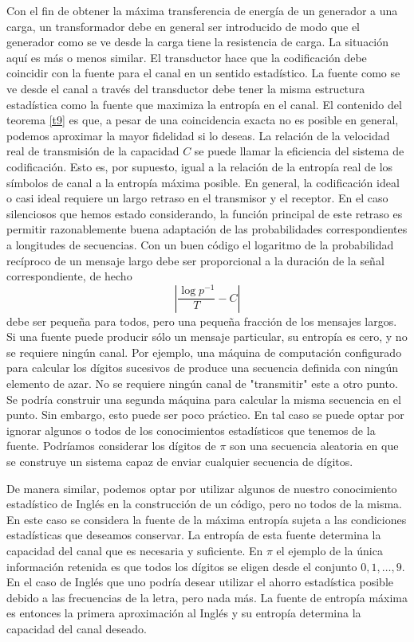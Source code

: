 Con el fin de obtener la m\'axima transferencia de energ\'ia de un
generador a una carga, un transformador debe en general ser
introducido de modo que el generador como se ve desde la carga tiene
la resistencia de carga. La situaci\'on aqu\'i es m\'as o menos
similar. El transductor hace que la codificaci\'on debe coincidir con
la fuente para el canal en un sentido estad\'istico. La fuente como se
ve desde el canal a trav\'es del transductor debe tener la misma
estructura estad\'istica como la fuente que maximiza la entrop\'ia en
el canal. El contenido del teorema \ref{t9} es que, a pesar de una
coincidencia exacta no es posible en general, podemos aproximar la
mayor fidelidad si lo deseas. La relaci\'on de la velocidad real de
transmisi\'on de la capacidad $C$ se puede llamar la eficiencia del
sistema de codificaci\'on. Esto es, por supuesto, igual a la
relaci\'on de la entrop\'ia real de los s\'imbolos de canal a la
entrop\'ia m\'axima posible. En general, la codificaci\'on ideal o
casi ideal requiere un largo retraso en el transmisor y el receptor.
En el caso silenciosos que hemos estado considerando, la funci\'on
principal de este retraso es permitir razonablemente buena
adaptaci\'on de las probabilidades correspondientes a longitudes de
secuencias. Con un buen c\'odigo el logaritmo de la probabilidad
rec\'iproco de un mensaje largo debe ser proporcional a la duraci\'on
de la se\~{n}al correspondiente, de hecho
\begin{equation}
\left |\frac{\log p^{-1}}{T} - C \right |
\end{equation}
debe ser peque\~{n}a para todos, pero una peque\~{n}a fracci\'on de
los mensajes largos. Si una fuente puede producir s\'olo un mensaje
particular, su entrop\'ia es cero, y no se requiere ning\'un canal.
Por ejemplo, una m\'aquina de computaci\'on configurado para calcular
los d\'igitos sucesivos de produce una secuencia definida con ning\'un
elemento de azar. No se requiere ning\'un canal de "transmitir" este a
otro punto. Se podr\'ia construir una segunda m\'aquina para calcular
la misma secuencia en el punto. Sin embargo, esto puede ser poco
pr\'actico. En tal caso se puede optar por ignorar algunos o todos de
los conocimientos estad\'isticos que tenemos de la fuente. Podr\'iamos
considerar los d\'igitos de $\pi$ son una secuencia aleatoria en que
se construye un sistema capaz de enviar cualquier secuencia de
d\'igitos.

De manera similar, podemos optar por utilizar algunos de nuestro
conocimiento estad\'istico de Ingl\'es en la construcci\'on de un
c\'odigo, pero no todos de la misma. En este caso se considera la
fuente de la m\'axima entrop\'ia sujeta a las condiciones
estad\'isticas que deseamos conservar. La entrop\'ia de esta fuente
determina la capacidad del canal que es necesaria y suficiente. En
$\pi$ el ejemplo de la \'unica informaci\'on retenida es que todos los
d\'igitos se eligen desde el conjunto $0, 1, \ldots, 9$. En el caso de
Ingl\'es que uno podr\'ia desear utilizar el ahorro estad\'istica
posible debido a las frecuencias de la letra, pero nada m\'as. La
fuente de entrop\'ia m\'axima es entonces la primera aproximaci\'on al
Ingl\'es y su entrop\'ia determina la capacidad del canal deseado.

